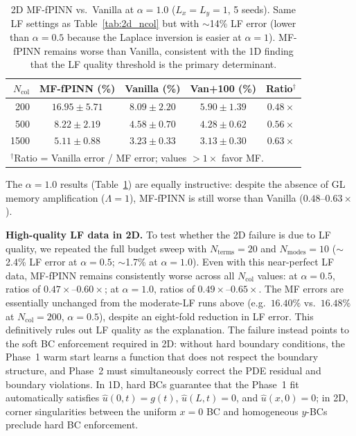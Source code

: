 \documentclass[11pt]{article}
\newcommand{\Ncol}{N_{\mathrm{col}}}
\begin{document}
\begin{table}[t]
\centering
\caption{2D MF-fPINN vs.\ Vanilla at $\alpha = 1.0$ ($L_x = L_y = 1$, 5 seeds). Same LF settings as Table~\ref{tab:2d_ncol} but with $\sim$14\% LF error (lower than $\alpha = 0.5$ because the Laplace inversion is easier at $\alpha = 1$). MF-fPINN remains worse than Vanilla, consistent with the 1D finding that the LF quality threshold is the primary determinant.}
\label{tab:2d_ncol_a10}
\begin{tabular}{rcccc}
\toprule
$\Ncol$ & MF-fPINN (\%) & Vanilla (\%) & Van+100 (\%) & Ratio$^\dagger$ \\
\midrule
200 & $16.95 \pm 5.71$ & $8.09 \pm 2.20$ & $5.90 \pm 1.39$ & $0.48\times$ \\
500 & $8.22 \pm 2.19$ & $4.58 \pm 0.70$ & $4.28 \pm 0.62$ & $0.56\times$ \\
1500 & $5.11 \pm 0.88$ & $3.23 \pm 0.33$ & $3.13 \pm 0.30$ & $0.63\times$ \\
\bottomrule
\multicolumn{5}{l}{\small $^\dagger$Ratio = Vanilla error / MF error; values $>1\times$ favor MF.} \\
\end{tabular}
\end{table}

The $\alpha = 1.0$ results (Table~\ref{tab:2d_ncol_a10}) are equally instructive: despite the absence of GL memory amplification ($\Lambda = 1$), MF-fPINN is still worse than Vanilla ($0.48$--$0.63\times$).

\textbf{High-quality LF data in 2D.} To test whether the 2D failure is due to LF quality, we repeated the full budget sweep with $N_{\mathrm{terms}} = 20$ and $N_{\mathrm{modes}} = 10$ ($\sim$2.4\% LF error at $\alpha = 0.5$; $\sim$1.7\% at $\alpha = 1.0$). Even with this near-perfect LF data, MF-fPINN remains consistently worse across all $\Ncol$ values: at $\alpha = 0.5$, ratios of $0.47\times$--$0.60\times$; at $\alpha = 1.0$, ratios of $0.49\times$--$0.65\times$. The MF errors are essentially unchanged from the moderate-LF runs above (e.g.\ $16.40\%$ vs.\ $16.48\%$ at $\Ncol = 200$, $\alpha = 0.5$), despite an eight-fold reduction in LF error. This definitively rules out LF quality as the explanation. The failure instead points to the soft BC enforcement required in 2D: without hard boundary conditions, the Phase~1 warm start learns a function that does not respect the boundary structure, and Phase~2 must simultaneously correct the PDE residual and boundary violations. In 1D, hard BCs guarantee that the Phase~1 fit automatically satisfies $\hat{u}(0,t) = g(t)$, $\hat{u}(L,t) = 0$, and $\hat{u}(x,0) = 0$; in 2D, corner singularities between the uniform $x = 0$ BC and homogeneous $y$-BCs preclude hard BC enforcement.
\end{document}

